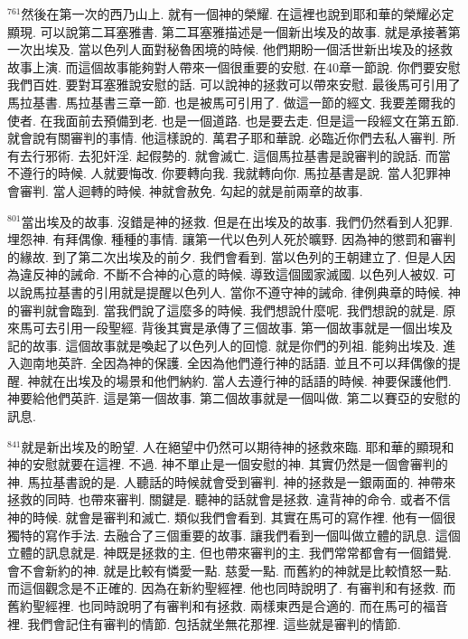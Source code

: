 \documentclass{book}
\begin{document}
$^{761}$然後在第一次的西乃山上.
就有一個神的榮耀.
在這裡也說到耶和華的榮耀必定顯現.
可以說第二耳塞雅書.
第二耳塞雅描述是一個新出埃及的故事.
就是承接著第一次出埃及.
當以色列人面對秘魯困境的時候.
他們期盼一個活世新出埃及的拯救故事上演.
而這個故事能夠對人帶來一個很重要的安慰.
在40章一節說.
你們要安慰我們百姓.
要對耳塞雅說安慰的話.
可以說神的拯救可以帶來安慰.
最後馬可引用了馬拉基書.
馬拉基書三章一節.
也是被馬可引用了.
做這一節的經文.
我要差爾我的使者.
在我面前去預備到老.
也是一個道路.
也是要去走.
但是這一段經文在第五節.
就會說有關審判的事情.
他這樣說的.
萬君子耶和華說.
必臨近你們去私人審判.
所有去行邪術.
去犯奸淫.
起假勢的.
就會滅亡.
這個馬拉基書是說審判的說話.
而當不遵行的時候.
人就要悔改.
你要轉向我.
我就轉向你.
馬拉基書是說.
當人犯罪神會審判.
當人迴轉的時候.
神就會赦免.
勾起的就是前兩章的故事.

$^{801}$當出埃及的故事.
沒錯是神的拯救.
但是在出埃及的故事.
我們仍然看到人犯罪.
埋怨神.
有拜偶像.
種種的事情.
讓第一代以色列人死於曠野.
因為神的懲罰和審判的緣故.
到了第二次出埃及的前夕.
我們會看到.
當以色列的王朝建立了.
但是人因為違反神的誡命.
不斷不合神的心意的時候.
導致這個國家滅國.
以色列人被奴.
可以說馬拉基書的引用就是提醒以色列人.
當你不遵守神的誡命.
律例典章的時候.
神的審判就會臨到.
當我們說了這麼多的時候.
我們想說什麼呢.
我們想說的就是.
原來馬可去引用一段聖經.
背後其實是承傳了三個故事.
第一個故事就是一個出埃及記的故事.
這個故事就是喚起了以色列人的回憶.
就是你們的列祖.
能夠出埃及.
進入迦南地英許.
全因為神的保護.
全因為他們遵行神的話語.
並且不可以拜偶像的提醒.
神就在出埃及的場景和他們納約.
當人去遵行神的話語的時候.
神要保護他們.
神要給他們英許.
這是第一個故事.
第二個故事就是一個叫做.
第二以賽亞的安慰的訊息.

$^{841}$就是新出埃及的盼望.
人在絕望中仍然可以期待神的拯救來臨.
耶和華的顯現和神的安慰就要在這裡.
不過.
神不單止是一個安慰的神.
其實仍然是一個會審判的神.
馬拉基書說的是.
人聽話的時候就會受到審判.
神的拯救是一銀兩面的.
神帶來拯救的同時.
也帶來審判.
關鍵是.
聽神的話就會是拯救.
違背神的命令.
或者不信神的時候.
就會是審判和滅亡.
類似我們會看到.
其實在馬可的寫作裡.
他有一個很獨特的寫作手法.
去融合了三個重要的故事.
讓我們看到一個叫做立體的訊息.
這個立體的訊息就是.
神既是拯救的主.
但也帶來審判的主.
我們常常都會有一個錯覺.
會不會新約的神.
就是比較有憐愛一點.
慈愛一點.
而舊約的神就是比較憤怒一點.
而這個觀念是不正確的.
因為在新約聖經裡.
他也同時說明了.
有審判和有拯救.
而舊約聖經裡.
也同時說明了有審判和有拯救.
兩樣東西是合適的.
而在馬可的福音裡.
我們會記住有審判的情節.
包括就坐無花那裡.
這些就是審判的情節.
\end{document}
